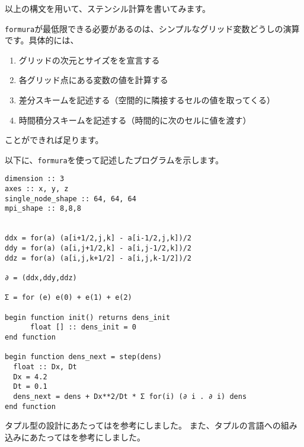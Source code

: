 \documentclass{jsarticle}
\newcommand{\formura}{{\texttt{formura}}}
\begin{document}
以上の構文を用いて、ステンシル計算を書いてみます。


\formura が最低限できる必要があるのは、シンプルなグリッド変数どうしの演算です。具体的には、

\begin{enumerate}
\item グリッドの次元とサイズをを宣言する
\item 各グリッド点にある変数の値を計算する
\item 差分スキームを記述する（空間的に隣接するセルの値を取ってくる）
\item 時間積分スキームを記述する（時間的に次のセルに値を渡す）
\end{enumerate}

ことができれば足ります。

以下に、\formura を使って記述したプログラムを示します。

\begin{lstlisting}[mathescape]
dimension :: 3
axes :: x, y, z
single_node_shape :: 64, 64, 64
mpi_shape :: 8,8,8


ddx = for(a) (a[i+1/2,j,k] - a[i-1/2,j,k])/2
ddy = for(a) (a[i,j+1/2,k] - a[i,j-1/2,k])/2
ddz = for(a) (a[i,j,k+1/2] - a[i,j,k-1/2])/2

∂ = (ddx,ddy,ddz)

Σ = for (e) e(0) + e(1) + e(2)

begin function init() returns dens_init
      float [] :: dens_init = 0
end function

begin function dens_next = step(dens)
  float :: Dx, Dt
  Dx = 4.2
  Dt = 0.1
  dens_next = dens + Dx**2/Dt * Σ for(i) (∂ i . ∂ i) dens
end function
\end{lstlisting}

タプル型の設計にあたっては\citet{pierce2002types}を参考にしました。
また、タプルの言語への組み込みにあたっては\citet{oliveira2015modular}を参考にしました。





\end{document}
